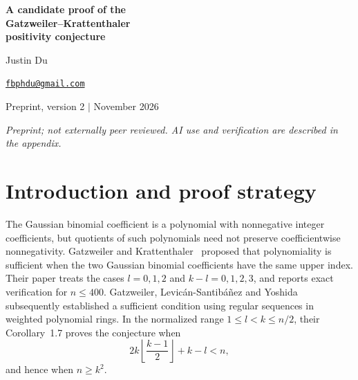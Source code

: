 \documentclass[11pt,a4paper]{article}
\numberwithin{equation}{section}
\theoremstyle{remark}
\newcommand{\floor}[1]{\left\lfloor #1\right\rfloor}
\begin{document}
\begin{center}
  {\fontsize{24}{29}\selectfont\bfseries A candidate proof of the\\[4pt]
  Gatzweiler--Krattenthaler\\[4pt]
  positivity conjecture\par}
  \vspace{10pt}
  {\large Justin Du\par}
  \vspace{5pt}
  \href{mailto:fbphdu@gmail.com}{\texttt{fbphdu@gmail.com}}\par
  \vspace{10pt}
  Preprint, version 2 \quad$\vert$ November 2026
\end{center}
\vspace{5pt}

\begin{abstract}
Gatzweiler and Krattenthaler conjectured that a polynomial quotient of two
Gaussian binomial coefficients with the same upper index has nonnegative
coefficients. We present a candidate proof for the complete parameter range.
After cancellation, polynomiality gives divisibility-count inequalities for
two separated integer intervals of equal length. We prove that every subset
of the lower interval generates at least as many elements of the upper
interval in its additive semigroup. The criterion of Gatzweiler,
Levic\'an-Santib\'a\~nez and Yoshida then supplies a regular sequence whose
Hilbert series is the required quotient. The central lemma uses a mixed
sumset modulo the largest generator not exceeding the interval length.
Kneser's theorem, together with separate capacities for the lower and upper
generators, handles all stabilizers and all collisions of residues.
Two-generator representations treat subsets near the upper endpoint.
A second sumset estimate handles small lower indices, and a necessary
inequality from polynomiality leaves only two explicit boundary families.
The proof has no finite parameter cutoff; exact computations are supplied
as supplementary checks.
\end{abstract}

{\small\itshape Preprint; not externally peer reviewed.
AI use and verification are described in the appendix.}

\section*{Introduction and proof strategy}

The Gaussian binomial coefficient is a polynomial with nonnegative integer
coefficients, but quotients of such polynomials need not preserve
coefficientwise nonnegativity. Gatzweiler and Krattenthaler~\cite{GK}
proposed that polynomiality is sufficient when the two Gaussian binomial
coefficients have the same upper index. Their paper treats the cases
$l=0,1,2$ and $k-l=0,1,2,3$, and reports exact verification for $n\le 400$.
Gatzweiler, Levic\'an-Santib\'a\~nez and Yoshida~\cite{GLY} subsequently
established a sufficient condition using regular sequences in weighted
polynomial rings. In the normalized range $1\le l<k\le n/2$, their
Corollary~1.7 proves the conjecture when
\[
  2k\floor{\frac{k-1}{2}}+k-l<n,
\]
and hence when $n\ge k^2$.
\end{document}
